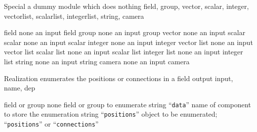        {Special}
       {a dummy module which does nothing}
       {}
       {field, group, vector, scalar, integer, vectorlist, scalarlist,
        integerlist, string, camera}

\begin{ModuleInputs}
          {field}
          {none}
          {an input field}{}
          {group}
          {none}
          {an input group}{}
          {vector}
          {none}
          {an input scalar}{}
          {scalar}
          {none}
          {an input scalar}{}
          {integer}
          {none}
          {an input integer}{}
          {vector list}
          {none}
          {an input vector list}{}
          {scalar list}
          {none}
          {an input scalar list}{}
          {integer list}
          {none}
          {an input integer list}{}
          {string}
          {none}
          {an input string}{}
          {camera}
          {none}
          {an input camera}{}
\end{ModuleInputs}







       {Realization}
       {enumerates the positions or connections in a field}
       {output}
       {input, name, dep}

\begin{ModuleInputs}
          {field or group}
          {none}
          {field or group to enumerate}{}
          {string}
          {``{\tt data}''}
          { name of component to store the enumeration}{}
          {string}
          {``{\tt positions}''}
          {object to be enumerated; ``{\tt positions}'' or ``{\tt connections}''}{}
\end{ModuleInputs}

